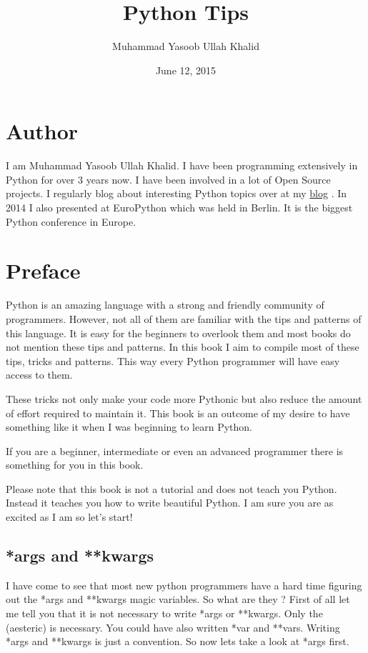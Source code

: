 \documentclass[a4paper,12pt,oneside]{sphinxmanual}
\title{Python Tips}
\date{June 12, 2015}
\author{Muhammad Yasoob Ullah Khalid}
\begin{document}
\maketitle
\tableofcontents
{}\label{index::doc}



\part{Author}
\label{index:python-tips}\label{index:author}
I am Muhammad Yasoob Ullah Khalid. I have been programming extensively in Python for over 3 years now. I have been involved in a lot of Open Source projects. I regularly blog about interesting Python topics over at my \href{http://www.freepythontips.wordpress.com}{blog} . In 2014 I also presented at EuroPython which was held in Berlin. It is the biggest Python conference in Europe.


\part{Preface}
\label{index:preface}
Python is an amazing language with a strong and friendly community of programmers. However, not all of them are familiar with the tips and patterns of this language. It is easy for the beginners to overlook them and most books do not mention these tips and patterns. In this book I aim to compile most of these tips, tricks and patterns. This way every Python programmer will have easy access to them.

These tricks not only make your code more Pythonic but also reduce the amount of effort required to maintain it. This book is an outcome of my desire to have something like it when I was beginning to learn Python.

If you are a beginner, intermediate or even an advanced programmer there is something for you in this book.

Please note that this book is not a tutorial and does not teach you Python. Instead it teaches you how to write beautiful Python. I am sure you are as excited as I am so let's start!


\chapter{*args and **kwargs}
\label{args_and_kwargs:args-and-kwargs}\label{args_and_kwargs::doc}
I have come to see that most new python programmers have a hard time
figuring out the *args and **kwargs magic variables. So what are they
? First of all let me tell you that it is not necessary to write *args
or **kwargs. Only the \code{*} (aesteric) is necessary. You could have
also written *var and **vars. Writing *args and **kwargs is just a
convention. So now lets take a look at *args first.
\end{document}
